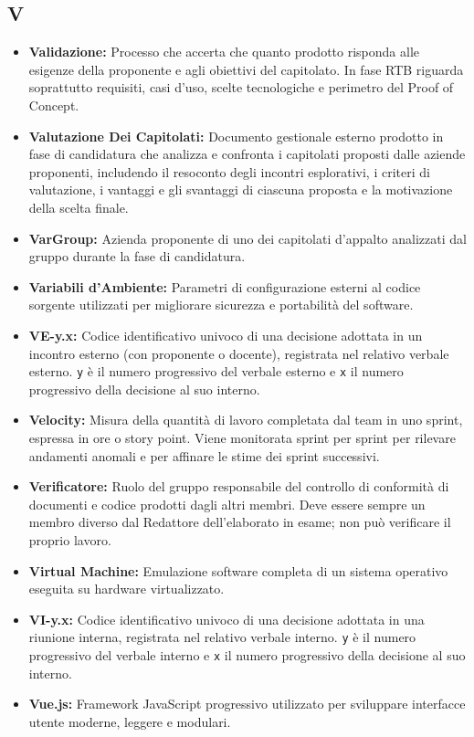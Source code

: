 \subsection*{V}
\begin{itemize}[leftmargin=*]
      \item \textbf{Validazione:} Processo che accerta che quanto prodotto risponda alle esigenze della proponente e agli obiettivi del capitolato. In fase RTB riguarda soprattutto requisiti, casi d'uso, scelte tecnologiche e perimetro del Proof of Concept.
      \item \textbf{Valutazione Dei Capitolati:} Documento gestionale esterno prodotto
          in fase di candidatura che analizza e confronta i capitolati proposti
          dalle aziende proponenti, includendo il resoconto degli incontri
          esplorativi, i criteri di valutazione, i vantaggi e gli svantaggi di
          ciascuna proposta e la motivazione della scelta finale.
      \item \textbf{VarGroup:} Azienda proponente di uno dei capitolati d'appalto analizzati dal gruppo durante la fase di candidatura.
      \item \textbf{Variabili d’Ambiente:} Parametri di configurazione esterni al codice sorgente utilizzati per migliorare sicurezza e portabilità del software.
      \item \textbf{VE-y.x:} Codice identificativo univoco di una decisione adottata
          in un incontro esterno (con proponente o docente), registrata nel relativo
          verbale esterno. \texttt{y} è il numero progressivo del verbale esterno
          e \texttt{x} il numero progressivo della decisione al suo interno.
      \item \textbf{Velocity:} Misura della quantità di lavoro completata dal team in uno
      sprint, espressa in ore o story point. Viene monitorata sprint
      per sprint per rilevare andamenti anomali e per affinare le stime dei sprint
      successivi.
      \item \textbf{Verificatore:} Ruolo del gruppo responsabile del controllo di
          conformità di documenti e codice prodotti dagli altri membri. Deve essere
          sempre un membro diverso dal Redattore dell'elaborato in esame; non può
          verificare il proprio lavoro.
      \item \textbf{Virtual Machine:} Emulazione software completa di un sistema operativo eseguita su hardware virtualizzato.
      \item \textbf{VI-y.x:} Codice identificativo univoco di una decisione adottata
          in una riunione interna, registrata nel relativo verbale interno.
          \texttt{y} è il numero progressivo del verbale interno e \texttt{x} il
          numero progressivo della decisione al suo interno.
      \item \textbf{Vue.js:} Framework JavaScript progressivo utilizzato per sviluppare interfacce utente moderne, leggere e modulari.
\end{itemize}
 
